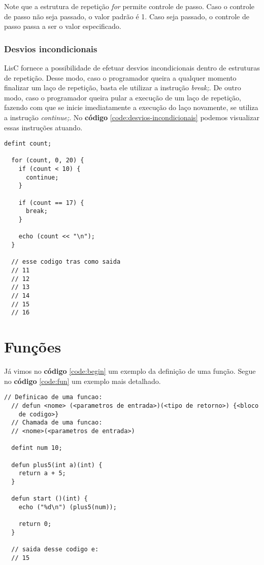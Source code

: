 \documentclass[
  12pt,				%
  oneside,			%
  a4paper,			%
  english,			%
  french,				%
  spanish,			%
  brazil,				%
]{abntex2}
\begin{document}
Note que a estrutura de repetição \emph{for} permite controle de
passo. Caso o controle de passo não seja passado, o valor padrão é
1. Caso seja passado, o controle de passo passa a ser o valor especificado.

\subsection{Desvios incondicionais}
\label{subsec:desvios-incondicionais}

LisC fornece a possibilidade de efetuar desvios incondicionais dentro
de estruturas de repetição. Desse modo, caso o programador queira a
qualquer momento finalizar um laço de repetição, basta ele utilizar a
instrução \emph{break;}. De outro modo, caso o programador queira pular
a execução de um laço de repetição, fazendo com que se inicie
imediatamente a execução do laço novamente, se utiliza a instrução
\emph{continue;}. No \textbf{código} \ref{code:desvios-incondicionais}
podemos visualizar essas instruções atuando.

\begin{lstlisting}[label=code:desvios-incondicionais,caption=Exemplo
  de código de desvios incondicionais]
  defint count;

  for (count, 0, 20) {
    if (count < 10) {
      continue;
    }

    if (count == 17) {
      break;
    }

    echo (count << "\n");
  }

  // esse codigo tras como saida
  // 11
  // 12
  // 13
  // 14
  // 15
  // 16
\end{lstlisting}

\chapter{Funções}
\label{cha:funcoes}

Já vimos no \textbf{código} \ref{code:begin} um exemplo da definição
de uma função. Segue no \textbf{código} \ref{code:fun} um exemplo mais
detalhado.

\begin{lstlisting}[label=code:fun,caption=Exemplo de definição de uma
  função]
  // Definicao de uma funcao:
  // defun <nome> (<parametros de entrada>)(<tipo de retorno>) {<bloco
    de codigo>}
  // Chamada de uma funcao:
  // <nome>(<parametros de entrada>)

  defint num 10;
  
  defun plus5(int a)(int) {
    return a + 5;
  }

  defun start ()(int) {
    echo ("%d\n") (plus5(num));

    return 0;
  }

  // saida desse codigo e:
  // 15
\end{lstlisting}
\end{document}
